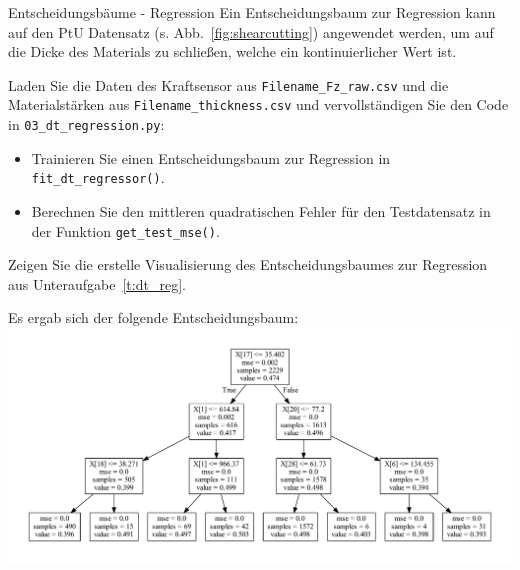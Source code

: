 \begin{task}[credit=3]{Entscheidungsbäume - Regression}
Ein Entscheidungsbaum zur Regression kann auf den PtU Datensatz (s. Abb.~\ref{fig:shearcutting}) angewendet werden, um auf die Dicke des Materials zu schließen, welche ein kontinuierlicher Wert ist. 

 \begin{subtask}[points=2,title=\codesym~\texttt{03\_dt\_regression.py}]
 \label{t:dt_reg}
 Laden Sie die Daten des Kraftsensor aus \texttt{Filename\_Fz\_raw.csv} und die Materialstärken aus \texttt{Filename\_thickness.csv} und vervollständigen Sie den Code in \texttt{03\_dt\_regression.py}:
 
\begin{itemize}
    \item[\codesym] Trainieren Sie einen Entscheidungsbaum zur Regression in \texttt{fit\_dt\_regressor()}.
    \item[\codesym] Berechnen Sie den mittleren quadratischen Fehler für den Testdatensatz in der Funktion \texttt{get\_test\_mse()}.
\end{itemize}
\end{subtask}

 \begin{subtask}[points=1,title=Visualisierung]
Zeigen Sie die erstelle Visualisierung des Entscheidungsbaumes zur Regression aus Unteraufgabe~\ref{t:dt_reg}.

\begin{solution}
	Es ergab sich der folgende Entscheidungsbaum:
\includegraphics[width=\linewidth]{regression_tree_d3.pdf}
\end{solution}

\end{subtask}
\end{task}

